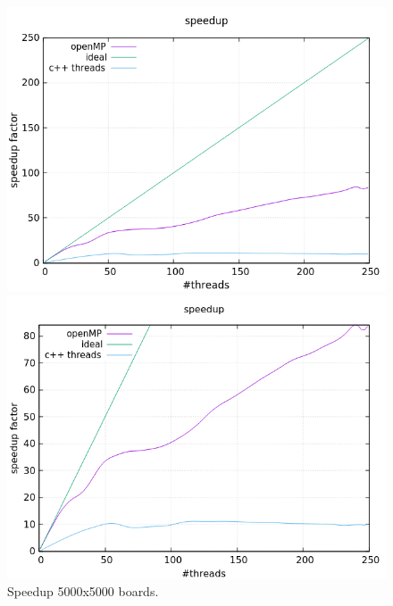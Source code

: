 \documentclass[a4paper,10pt]{article}
\begin{document}
\begin{figure}[H]
	\centering
	\begin{minipage}[t]{0.55\linewidth}
		\includegraphics[width=\linewidth]{5000_standard_speed.png}
	\end{minipage}%
	\begin{minipage}[t]{0.55\linewidth}
		\includegraphics[width=\linewidth]{5000_zoomed_speed.png}
	\end{minipage}
	\caption{Speedup 5000x5000 boards.}
	\label{50000Speed}
\end{figure}
\end{document}
